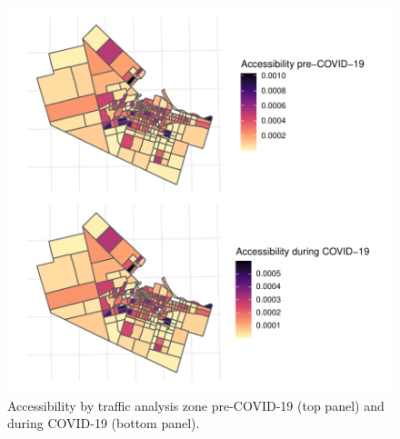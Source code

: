 \documentclass[]{elsarticle} %
\begin{document}
\begin{figure}

{\centering \includegraphics[width=0.9\linewidth]{Accessibility-Foodbanks-Hamilton_files/figure-latex/plot-accessibility-1} 

}

\caption{\label{fig:accessibility}Accessibility by traffic analysis zone pre-COVID-19 (top panel) and during COVID-19 (bottom panel).}\label{fig:plot-accessibility}
\end{figure}
\end{document}
